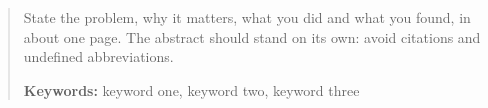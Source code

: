\begin{abstract}
State the problem, why it matters, what you did and what you found, in about
one page. The abstract should stand on its own: avoid citations and undefined
abbreviations.

\vspace{1em}
\noindent\textbf{Keywords:} keyword one, keyword two, keyword three
\end{abstract}
